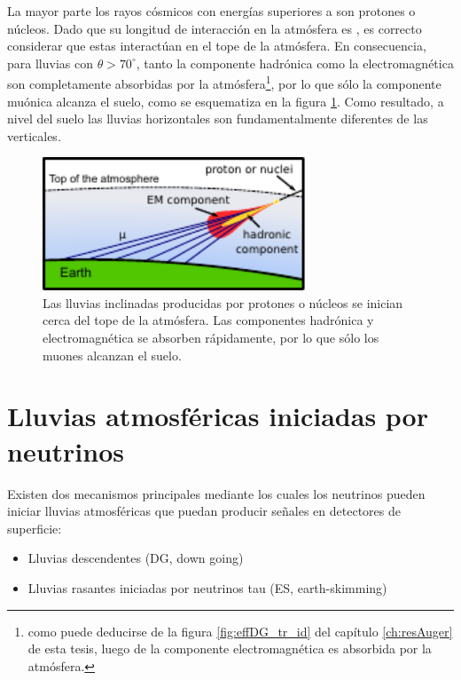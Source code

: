 La mayor parte los rayos cósmicos con energías superiores a  son protones o n\'ucleos.
Dado que su longitud de interacción en la atmósfera es , es correcto considerar que estas interact\'uan en el tope de la atmósfera.
En consecuencia, para lluvias con $\theta>70^\circ$, tanto la componente hadrónica como la electromagnética son completamente absorbidas por la atmósfera\footnote{como puede deducirse de la figura \ref{fig:effDG_tr_id} del cap\'itulo \ref{ch:resAuger} de esta tesis, luego de  la componente electromagn\'etica es absorbida por la atm\'osfera.}, por lo que sólo la componente muónica alcanza el suelo, como se esquematiza en la figura \ref{fig:horizontalHad}.
Como resultado, a nivel del suelo las lluvias horizontales son fundamentalmente diferentes de las verticales.
%
\begin{figure}[h!]
\begin{center}
\includegraphics[width=0.7\textwidth]{fig/EASAuger/horizontal2_english.pdf}
\caption{Las lluvias inclinadas producidas por protones o n\'ucleos se inician cerca del tope de la atmósfera.
Las componentes hadrónica y electromagnética se absorben rápidamente, por lo que sólo los muones alcanzan el suelo.
}
\label{fig:horizontalHad}
\end{center}
\end{figure}

\section{Lluvias atmosf\'ericas iniciadas por neutrinos}
\label{sc:easNu}

Existen dos mecanismos principales mediante los cuales los neutrinos pueden iniciar lluvias atmosféricas que puedan producir señales en detectores de superficie:
\begin{itemize}
 \item Lluvias descendentes (DG, down going)
 \item Lluvias rasantes iniciadas por neutrinos tau (ES, earth-skimming)
\end{itemize}

